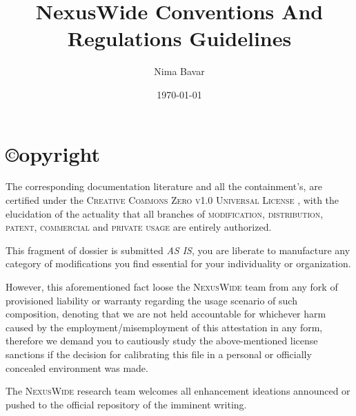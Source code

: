 \documentclass[13pt]{scrarticle}
\title{NexusWide Conventions And Regulations Guidelines}
\author{Nima Bavar}
\date{\today}
\newcommand{\header}[1]{ \textsf{#1} \relax{}}
\newcommand{\important}[1]{\textit{#1}}
\newcommand{\name}[1]{{\textsc{#1}}}
\begin{document}
    \raggedright
    \pagestyle{fancy}

    \fancyhf{}

    \lhead{\leftmark}
    \rhead{\rightmark}
    \rfoot{\thepage}


    \thispagestyle{empty}
    \pagecolor{white}


    \thispagestyle{empty}
    \maketitle{}


    \newpage
    \thispagestyle{fancy}
    \setcounter{page}{2}

    \section*{\header{\copyright opyright}}
    \thispagestyle{empty}

    \raggedright
    The corresponding documentation literature and all the containment's, are certified under the \name{Creative Commons Zero v1.0 Universal License} ,
    with the elucidation of the actuality that all branches of \name{modification}, \name{distribution}, \name{patent}, \name{commercial } and \name{private usage } are entirely authorized.
    \newline

    This fragment of dossier is submitted \important{AS IS},
    you are liberate to manufacture any category of modifications you find essential for your individuality or organization.
    \newline

    However, this aforementioned fact loose the \name{NexusWide } team from any fork of provisioned liability or warranty regarding the usage scenario of such composition,
    denoting that we are not held accountable for whichever harm caused by the employment/misemployment of this attestation in any form,
    therefore we demand you to cautiously study the above-mentioned license sanctions if the decision for calibrating this file in a
    personal or officially concealed environment was made. \newline

    The \name{NexusWide } research team welcomes all enhancement ideations announced or pushed to the official repository of the imminent writing.
    \newline


    \newpage
    \thispagestyle{empty}
\end{document}
